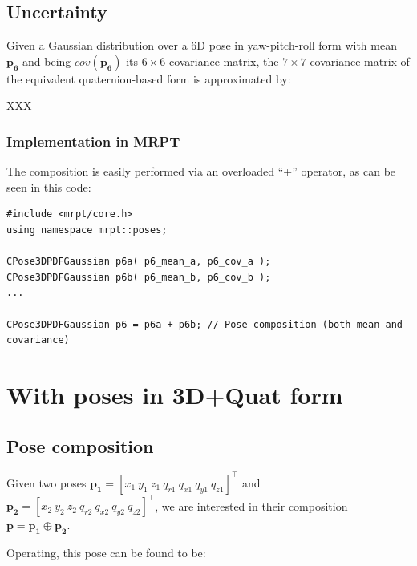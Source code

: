 \documentclass[a4paper,10pt]{report}
\begin{document}
\subsection{Uncertainty}

Given a Gaussian distribution over a 6D pose in yaw-pitch-roll form with 
mean ${\mathbf{\bar{p}_6}}$ and being  $cov(\mathbf{p_6})$ its $6 \times 6$ covariance matrix, 
the $7 \times 7$ covariance matrix of the equivalent quaternion-based form 
is approximated by:

XXX

\subsubsection{Implementation in MRPT}

The composition is easily performed via an overloaded ``+'' operator, as can be seen in this code:

\begin{lstlisting}
#include <mrpt/core.h> 
using namespace mrpt::poses; 

CPose3DPDFGaussian p6a( p6_mean_a, p6_cov_a ); 
CPose3DPDFGaussian p6b( p6_mean_b, p6_cov_b ); 
...

CPose3DPDFGaussian p6 = p6a + p6b; // Pose composition (both mean and covariance)
\end{lstlisting}




\section{With poses in 3D+Quat form}

\subsection{Pose composition}

Given two poses 
$\mathbf{p_1} = [x_1 ~ y_1 ~ z_1 ~  q_{r1} ~ q_{x1} ~ q_{y1} ~ q_{z1} ] ^ \top$
and 
$\mathbf{p_2} = [x_2 ~ y_2 ~ z_2 ~  q_{r2} ~ q_{x2} ~ q_{y2} ~ q_{z2} ] ^ \top$, 
we are interested in their composition $\mathbf{p}=\mathbf{p_1} \oplus \mathbf{p_2}$.

Operating, this pose can be found to be:
\end{document}
